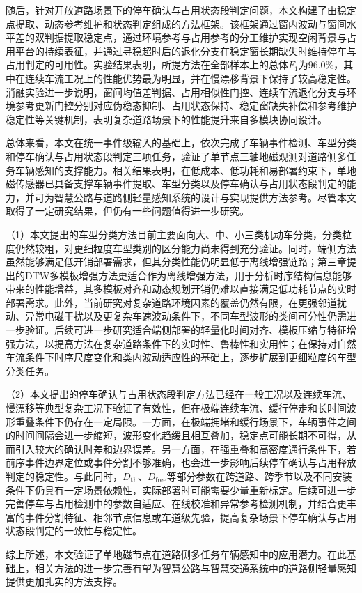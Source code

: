 \documentclass{xdupgthesis}
\begin{document}
随后，针对开放道路场景下的停车确认与占用状态段判定问题，本文构建了由稳定点提取、动态参考维护和状态判定组成的方法框架。该框架通过窗内波动与窗间水平差的双判据提取稳定点，通过环境参考与占用参考的分工维护实现空闲背景与占用平台的持续表征，并通过寻稳超时后的退化分支在稳定窗长期缺失时维持停车与占用判定的可用性。实验结果表明，所提方法在全部样本上的总体$F_1$为96.0\%，其中在连续车流工况上的性能优势最为明显，并在慢漂移背景下保持了较高稳定性。消融实验进一步说明，窗间均值差判据、占用相似性门控、连续车流退化分支与环境参考更新门控分别对应伪稳态抑制、占用状态保持、稳定窗缺失补偿和参考维护稳定性等关键机制，表明复杂道路场景下的性能提升来自多模块协同设计。

总体来看，本文在统一事件级输入的基础上，依次完成了车辆事件检测、车型分类和停车确认与占用状态段判定三项任务，验证了单节点三轴地磁观测对道路侧多任务车辆感知的支撑能力。相关结果表明，在低成本、低功耗和易部署约束下，单地磁传感器已具备支撑车辆事件提取、车型分类以及停车确认与占用状态段判定的能力，并可为智慧公路与道路侧轻量感知系统的设计与实现提供方法参考。尽管本文取得了一定研究结果，但仍有一些问题值得进一步研究。

（1）本文提出的车型分类方法目前主要面向大、中、小三类机动车分类，分类粒度仍然较粗，对更细粒度车型类别的区分能力尚未得到充分验证。同时，端侧方法虽然能够满足低开销部署需求，但其分类性能仍明显低于离线增强链路；第三章提出的DTW多模板增强方法更适合作为离线增强方法，用于分析时序结构信息能够带来的性能增益，其多模板对齐和动态规划开销仍难以直接满足低功耗节点的实时部署需求。此外，当前研究对复杂道路环境因素的覆盖仍然有限，在更强邻道扰动、异常电磁干扰以及更复杂车速波动条件下，不同车型波形的类间可分性仍需进一步验证。后续可进一步研究适合端侧部署的轻量化时间对齐、模板压缩与特征增强方法\cite{ch5_salvador2007fastdtw}，以提高方法在复杂道路条件下的实时性、鲁棒性和实用性；在保持对自然车流条件下时序尺度变化和类内波动适应性的基础上，逐步扩展到更细粒度的车型分类任务\cite{ch3_xu2017featuresets}。

（2）本文提出的停车确认与占用状态段判定方法已经在一般工况以及连续车流、慢漂移等典型复杂工况下验证了有效性，但在极端连续车流、缓行停走和长时间波形重叠条件下仍存在一定局限。一方面，在极端拥堵和缓行场景下，车辆事件之间的时间间隔会进一步缩短，波形变化趋缓且相互叠加，稳定点可能长期不可得，从而引入较大的确认时差和边界误差。另一方面，在强重叠和高密度通行条件下，若前序事件边界定位或事件分割不够准确，也会进一步影响后续停车确认与占用释放判定的稳定性。与此同时，$D_{\mathrm{th}}$、$D_{\mathrm{free}}$等部分参数在跨道路、跨季节以及不同安装条件下仍具有一定场景依赖性，实际部署时可能需要少量重新标定。后续可进一步完善停车与占用检测中的参数自适应、在线校准和异常参考检测机制\cite{ch5_cao2020magcal}，并结合更丰富的事件分割特征、相邻节点信息或车道级先验，提高复杂场景下停车确认与占用状态段判定的一致性与稳定性。

综上所述，本文验证了单地磁节点在道路侧多任务车辆感知中的应用潜力。在此基础上，相关方法的进一步完善有望为智慧公路与智慧交通系统中的道路侧轻量感知提供更加扎实的方法支撑。
\end{document}
